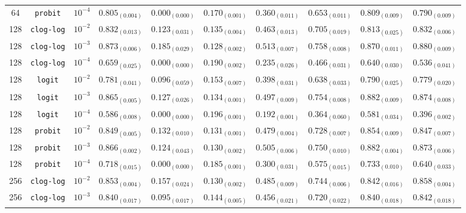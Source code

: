\documentclass[journal]{IEEEtran}
\begin{document}
\begin{table}[!t]
\begin{tabular}{c@{\hskip 0.15cm}c@{\hskip 0.15cm}c@{\hskip 0.15cm}c@{\hskip 0.30cm}c@{\hskip 0.20cm}c@{\hskip 0.20cm}c@{\hskip 0.20cm}c@{\hskip 0.20cm}c@{\hskip 0.20cm}c}
			64 & \texttt{probit} & $10^{-4}$ & $0.805_{(0.004)}$ & $0.000_{(0.000)}$ & $0.170_{(0.001)}$ & $0.360_{(0.011)}$ & $0.653_{(0.011)}$ & $0.809_{(0.009)}$ & $0.790_{(0.009)}$\\
			128 & \texttt{clog-log} & $10^{-2}$ & $0.832_{(0.013)}$ & $0.123_{(0.031)}$ & $0.135_{(0.004)}$ & $0.463_{(0.013)}$ & $0.705_{(0.019)}$ & $0.813_{(0.025)}$ & $0.832_{(0.006)}$\\
			128 & \texttt{clog-log} & $10^{-3}$ & $0.873_{(0.006)}$ & $\mathbf{0.185_{(0.029)}}$ & $0.128_{(0.002)}$ & $0.513_{(0.007)}$ & $0.758_{(0.008)}$ & $0.870_{(0.011)}$ & $0.880_{(0.009)}$\\
			128 & \texttt{clog-log} & $10^{-4}$ & $0.659_{(0.025)}$ & $0.000_{(0.000)}$ & $0.190_{(0.002)}$ & $0.235_{(0.026)}$ & $0.466_{(0.031)}$ & $0.640_{(0.030)}$ & $0.536_{(0.041)}$\\
			128 & \texttt{logit} & $10^{-2}$ & $0.781_{(0.041)}$ & $0.096_{(0.059)}$ & $0.153_{(0.007)}$ & $0.398_{(0.031)}$ & $0.638_{(0.033)}$ & $0.790_{(0.025)}$ & $0.779_{(0.020)}$\\
			128 & \texttt{logit} & $10^{-3}$ & $0.865_{(0.005)}$ & $0.127_{(0.026)}$ & $0.134_{(0.001)}$ & $0.497_{(0.009)}$ & $0.754_{(0.008)}$ & $0.882_{(0.009)}$ & $0.874_{(0.008)}$\\
			128 & \texttt{logit} & $10^{-4}$ & $0.586_{(0.008)}$ & $0.000_{(0.000)}$ & $0.196_{(0.001)}$ & $0.192_{(0.001)}$ & $0.364_{(0.060)}$ & $0.581_{(0.034)}$ & $0.396_{(0.002)}$\\
			128 & \texttt{probit} & $10^{-2}$ & $0.849_{(0.005)}$ & $0.132_{(0.010)}$ & $0.131_{(0.001)}$ & $0.479_{(0.004)}$ & $0.728_{(0.007)}$ & $0.854_{(0.009)}$ & $0.847_{(0.007)}$\\
			128 & \texttt{probit} & $10^{-3}$ & $0.866_{(0.002)}$ & $0.124_{(0.043)}$ & $0.130_{(0.002)}$ & $0.505_{(0.006)}$ & $0.750_{(0.010)}$ & $0.882_{(0.004)}$ & $0.873_{(0.006)}$\\
			128 & \texttt{probit} & $10^{-4}$ & $0.718_{(0.015)}$ & $0.000_{(0.000)}$ & $0.185_{(0.001)}$ & $0.300_{(0.031)}$ & $0.575_{(0.015)}$ & $0.733_{(0.010)}$ & $0.640_{(0.033)}$\\
			256 & \texttt{clog-log} & $10^{-2}$ & $0.853_{(0.004)}$ & $0.157_{(0.024)}$ & $0.130_{(0.002)}$ & $0.485_{(0.009)}$ & $0.744_{(0.006)}$ & $0.842_{(0.016)}$ & $0.858_{(0.004)}$\\
			256 & \texttt{clog-log} & $10^{-3}$ & $0.840_{(0.017)}$ & $0.095_{(0.017)}$ & $0.144_{(0.005)}$ & $0.456_{(0.021)}$ & $0.720_{(0.022)}$ & $0.840_{(0.018)}$ & $0.842_{(0.018)}$\\

\end{tabular}
\end{table}
\end{document}
